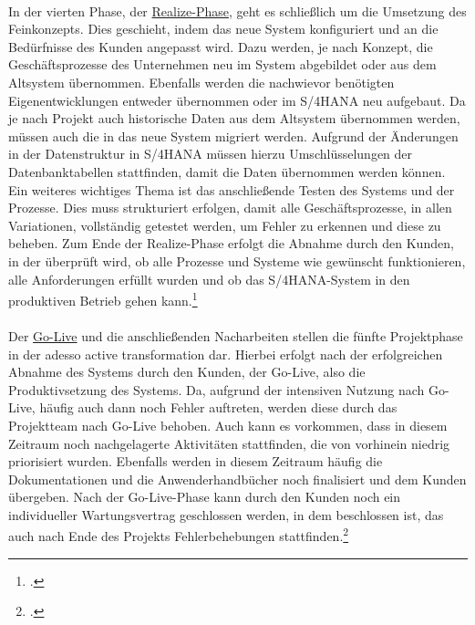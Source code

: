 \vspace{1em}
\\In der vierten Phase, der \underline{\glqq{}Realize\grqq{}-Phase}, geht es schließlich um die Umsetzung des Feinkonzepts. Dies geschieht, indem das neue System konfiguriert und an die Bedürfnisse des Kunden angepasst wird. Dazu werden, je nach Konzept, die Geschäftsprozesse des Unternehmen neu im System abgebildet oder aus dem Altsystem übernommen. Ebenfalls werden die nachwievor benötigten Eigenentwicklungen entweder übernommen oder im S/4HANA neu aufgebaut. Da je nach Projekt auch historische Daten aus dem Altsystem übernommen werden, müssen auch die in das neue System migriert werden. Aufgrund der Änderungen in der Datenstruktur in S/4HANA müssen hierzu Umschlüsselungen der Datenbanktabellen stattfinden, damit die Daten übernommen werden können. Ein weiteres wichtiges Thema ist das anschließende Testen des Systems und der Prozesse. Dies muss strukturiert erfolgen, damit alle Geschäftsprozesse, in allen Variationen, vollständig getestet werden, um Fehler zu erkennen und diese zu beheben. Zum Ende der Realize-Phase erfolgt die Abnahme durch den Kunden, in der überprüft wird, ob alle Prozesse und Systeme wie gewünscht funktionieren, alle Anforderungen erfüllt wurden und ob das S/4HANA-System in den produktiven Betrieb gehen kann.\footcite[Vgl.][]{aat-realize}\\
\vspace{1em}
\\Der \underline{\glqq{}Go-Live\grqq{}} und die anschließenden Nacharbeiten stellen die fünfte Projektphase in der adesso active transformation dar. Hierbei erfolgt nach der erfolgreichen Abnahme des Systems durch den Kunden, der Go-Live, also die Produktivsetzung des Systems. Da, aufgrund der intensiven Nutzung nach Go-Live, häufig auch dann noch Fehler auftreten, werden diese durch das Projektteam nach Go-Live behoben. Auch kann es vorkommen, dass in diesem Zeitraum noch nachgelagerte Aktivitäten stattfinden, die von vorhinein niedrig priorisiert wurden. Ebenfalls werden in diesem Zeitraum häufig die Dokumentationen und die Anwenderhandbücher noch finalisiert und dem Kunden übergeben. Nach der Go-Live-Phase kann durch den Kunden noch ein individueller Wartungsvertrag geschlossen werden, in dem beschlossen ist, das auch nach Ende des Projekts Fehlerbehebungen stattfinden.\footcite[Vgl.][]{aat-golive}


